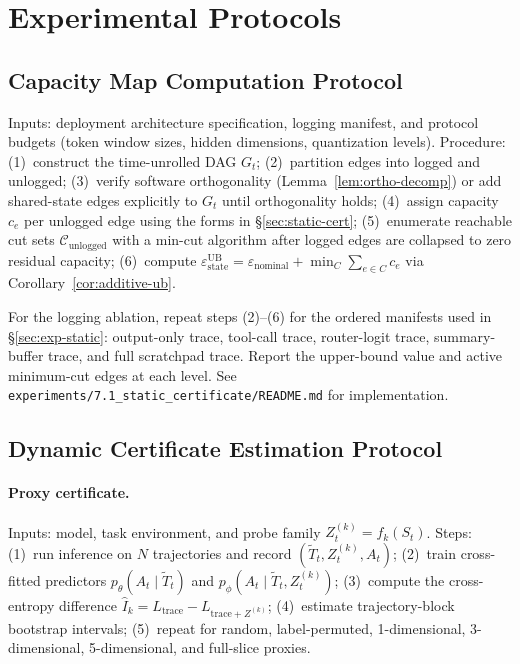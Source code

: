   \section{Experimental Protocols}
  \label{app:methodology}

  \subsection{Capacity Map Computation Protocol}

  Inputs: deployment architecture specification, logging manifest, and protocol
  budgets (token window sizes, hidden dimensions, quantization levels).
  Procedure: (1)~construct the time-unrolled DAG $G_t$; (2)~partition edges into
   logged and unlogged; (3)~verify software orthogonality
  (Lemma~\ref{lem:ortho-decomp}) or add shared-state edges explicitly to $G_t$
  until orthogonality holds; (4)~assign capacity $c_e$ per unlogged edge using
  the forms in \S\ref{sec:static-cert}; (5)~enumerate reachable cut sets
  $\mathcal{C}_\text{unlogged}$ with a min-cut algorithm after logged edges are
  collapsed to zero residual capacity; (6)~compute
  $\varepsilon_\text{state}^\text{UB} = \varepsilon_\text{nominal} + \min_C
  \sum_{e \in C} c_e$ via Corollary~\ref{cor:additive-ub}.

  For the logging ablation, repeat steps (2)--(6) for the ordered manifests used
   in \S\ref{sec:exp-static}: output-only trace, tool-call trace, router-logit
  trace, summary-buffer trace, and full scratchpad trace. Report the upper-bound
   value and active minimum-cut edges at each level. See
  \texttt{experiments/7.1\_static\_certificate/README.md} for implementation.

  \subsection{Dynamic Certificate Estimation Protocol}

  \paragraph{Proxy certificate.} Inputs: model, task environment, and probe
  family $Z_t^{(k)} = f_k(S_t)$. Steps: (1)~run inference on $N$ trajectories
  and record $(\tilde T_t, Z_t^{(k)}, A_t)$; (2)~train cross-fitted predictors
  $p_\theta(A_t \mid \tilde T_t)$ and $p_\phi(A_t \mid \tilde T_t, Z_t^{(k)})$;
  (3)~compute the cross-entropy difference $\hat I_k = L_\text{trace} -
  L_{\text{trace}+Z^{(k)}}$; (4)~estimate trajectory-block bootstrap intervals;
  (5)~repeat for random, label-permuted, 1-dimensional, 3-dimensional,
  5-dimensional, and full-slice proxies.

